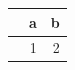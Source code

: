 \documentclass[11pt]{article}
\author{root}
\date{\today}
\title{}
\begin{document}
\tableofcontents

\begin{center}
\begin{tabular}{lrr}
 & a & b\\[0pt]
\hline
 & 1 & 2\\[0pt]
\end{tabular}
\end{center}
\end{document}
